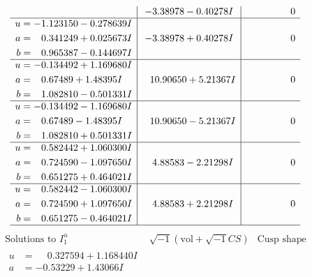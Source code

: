 \documentclass[1p]{elsarticle_modified}
\theoremstyle{definition}
\newcommand{\I}{\sqrt{-1}}
\begin{document}
$$\begin{array}{c|c|c}
 & -3.38978 - 0.40278 I & \phantom{-0.000000 } 0 \\ \hline\begin{aligned}
u &= -1.123150 - 0.278639 I \\
a &= \phantom{-}0.341249 + 0.025673 I \\
b &= \phantom{-}0.965387 - 0.144697 I\end{aligned}
 & -3.38978 + 0.40278 I & \phantom{-0.000000 } 0 \\ \hline\begin{aligned}
u &= -0.134492 + 1.169680 I \\
a &= \phantom{-}0.67489 + 1.48395 I \\
b &= \phantom{-}1.082810 - 0.501331 I\end{aligned}
 & \phantom{-}10.90650 + 5.21367 I & \phantom{-0.000000 } 0 \\ \hline\begin{aligned}
u &= -0.134492 - 1.169680 I \\
a &= \phantom{-}0.67489 - 1.48395 I \\
b &= \phantom{-}1.082810 + 0.501331 I\end{aligned}
 & \phantom{-}10.90650 - 5.21367 I & \phantom{-0.000000 } 0 \\ \hline\begin{aligned}
u &= \phantom{-}0.582442 + 1.060300 I \\
a &= \phantom{-}0.724590 - 1.097650 I \\
b &= \phantom{-}0.651275 + 0.464021 I\end{aligned}
 & \phantom{-}4.88583 - 2.21298 I & \phantom{-0.000000 } 0 \\ \hline\begin{aligned}
u &= \phantom{-}0.582442 - 1.060300 I \\
a &= \phantom{-}0.724590 + 1.097650 I \\
b &= \phantom{-}0.651275 - 0.464021 I\end{aligned}
 & \phantom{-}4.88583 + 2.21298 I & \phantom{-0.000000 } 0\\
 \hline 
 \end{array}$$\newpage$$\begin{array}{c|c|c}  
\text{Solutions to }I^u_{1}& \I (\text{vol} + \sqrt{-1}CS) & \text{Cusp shape}\\
 \hline 
\begin{aligned}
u &= \phantom{-}0.327594 + 1.168440 I \\
a &= -0.53229 + 1.43066 I \\

\end{aligned}
\end{array}$$
\end{document}
